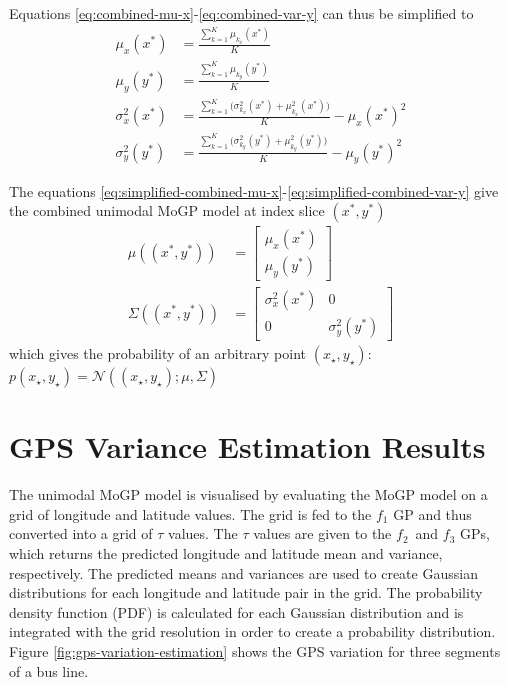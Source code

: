 Equations \ref{eq:combined-mu-x}-\ref{eq:combined-var-y} can thus be simplified to
\begin{align}
    \mu_x(x^*) &= \frac{\sum_{k=1}^{K} \mu_{k_x}(x^*)}{K} \label{eq:simplified-combined-mu-x} \\
    \mu_y(y^*) &= \frac{\sum_{k=1}^{K} \mu_{k_y}(y^*)}{K} \label{eq:simplified-combined-mu-y} \\
    \sigma_x^2(x^*) &= \frac{\sum_{k=1}^{K} \Big(\sigma_{k_x}^2(x^*) + \mu_{k_x}^2(x^*)\Big)}{K} - \mu_x(x^*)^2 \label{eq:simplified-combined-var-x} \\
    \sigma_y^2(y^*) &= \frac{\sum_{k=1}^{K} \Big(\sigma_{k_y}^2(y^*) + \mu_{k_y}^2(y^*)\Big)}{K} - \mu_y(y^*)^2 \label{eq:simplified-combined-var-y}
\end{align}

The equations \ref{eq:simplified-combined-mu-x}-\ref{eq:simplified-combined-var-y} give the combined unimodal MoGP model at index slice $(x^*, y^*)$
\begin{align}
\mu((x^*, y^*)) &= \begin{bmatrix} \mu_x(x^*) \\ \mu_y(y^*) \end{bmatrix} \\
\Sigma((x^*, y^*)) &= \begin{bmatrix} \sigma^2_x(x^*) & 0 \\ 0 & \sigma^2_y(y^*) \end{bmatrix}
\end{align}
which gives the probability of an arbitrary point $(x_\star, y_\star)$: $p(x_\star, y_\star) = \mathcal{N}((x_\star, y_\star); \mu, \Sigma)$

\section{GPS Variance Estimation Results} \label{sec:gps-var-result}

The unimodal MoGP model is visualised by evaluating the MoGP model on a grid of longitude and latitude values.
The grid is fed to the $f_1$ GP and thus converted into a grid of $\tau$ values.
The $\tau$ values are given to the $f_2$ and $f_3$ GPs, which returns the predicted longitude and latitude mean and variance, respectively. 
The predicted means and variances are used to create Gaussian distributions for each longitude and latitude pair in the grid.
The probability density function (PDF) is calculated for each Gaussian distribution and is integrated with the grid resolution in order to create a probability distribution.
Figure \ref{fig:gps-variation-estimation} shows the GPS variation for three segments of a bus line.

